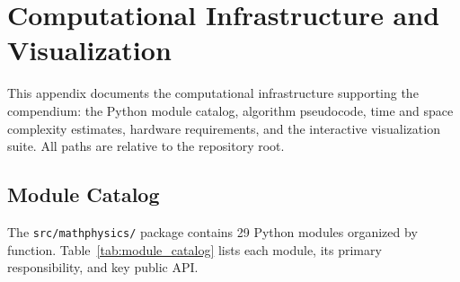 
\chapter{Computational Infrastructure and Visualization}
\label{app:computational}

This appendix documents the computational infrastructure supporting the
compendium: the Python module catalog, algorithm pseudocode, time and space
complexity estimates, hardware requirements, and the interactive visualization
suite.  All paths are relative to the repository root.

\section{Module Catalog}
\label{app:module_catalog}

The \texttt{src/mathphysics/} package contains 29 Python modules organized by
function.  Table~\ref{tab:module_catalog} lists each module, its primary
responsibility, and key public API.

